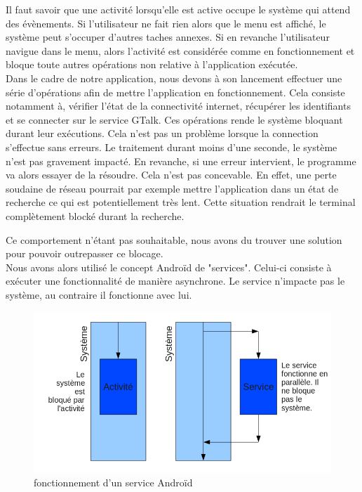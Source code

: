 Il faut savoir que une activité lorsqu'elle est active occupe le système qui attend des évènements.
Si l'utilisateur ne fait rien alors que le menu est affiché, le système peut s'occuper d'autres 
taches annexes. Si en revanche l'utilisateur navigue dans le menu, alors l'activité est considérée
comme en fonctionnement et bloque toute autres opérations non relative à l'application exécutée.
\\


Dans le cadre de notre application, nous devons à son lancement effectuer une série d'opérations 
afin de mettre l'application en fonctionnement. Cela consiste notamment à, vérifier l'état de la 
connectivité internet, récupérer les identifiants et se connecter sur le service GTalk. Ces 
opérations rende le système bloquant durant leur exécutions. Cela n'est pas un problème lorsque la 
connection s'effectue sans erreurs. Le traitement durant moins d'une seconde, le système n'est pas
gravement impacté. En revanche, si une erreur intervient, le programme va alors essayer de la résoudre.
Cela n'est pas concevable. En effet, une perte soudaine de réseau pourrait par exemple mettre 
l'application dans un état de recherche ce qui est potentiellement très lent. Cette situation rendrait
le terminal complètement blocké durant la recherche. 

Ce comportement n'étant pas souhaitable, nous avons du trouver une solution pour pouvoir outrepasser ce blocage.
\\


Nous avons alors utilisé le concept Androïd de "services". Celui-ci consiste à exécuter une fonctionnalité 
de manière asynchrone. Le service n'impacte pas le système, au contraire il fonctionne avec lui. 

\begin{figure}[!h]
	\center
	\includegraphics[width=13cm]{img/fonctionnement-des-services-android.png}
	\caption{fonctionnement d'un service Androïd}
	\label{fonctionnement-des-services-android}
\end{figure}

